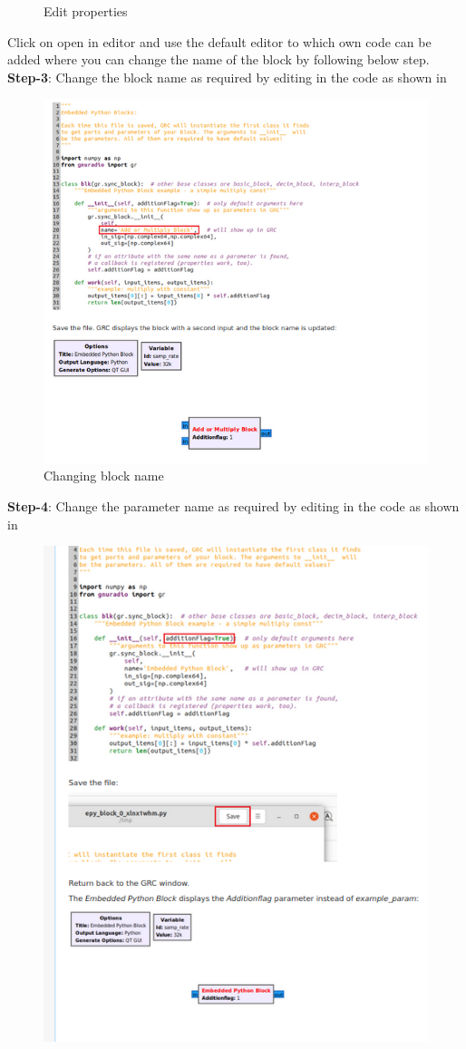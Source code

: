 \begin{enumerate}[label=\arabic*.,ref=\thesection.\theenumi]
\begin{figure}[H]
\caption{Edit properties}
\label{fig:Editproperties}
\end{figure}
Click on open in editor and use the default editor to which own code can be added where you can change the name of the block by following below step.\\
\textbf{Step-3}:
Change the block name as required by editing in the code as shown in                                                
\begin{figure}[H]
\centering
\includegraphics[width=\columnwidth]{fm/rx/figs/step_3.png}
\caption{Changing block name}
\label{fig:changingblockname}
\end{figure}
\textbf{Step-4}:
Change the parameter name as required by editing in the code as shown in                                                
\begin{figure}[H]
\centering
\includegraphics[width=0.7\columnwidth]{fm/rx/figs/step_4.png}

\end{figure}
\end{enumerate}
